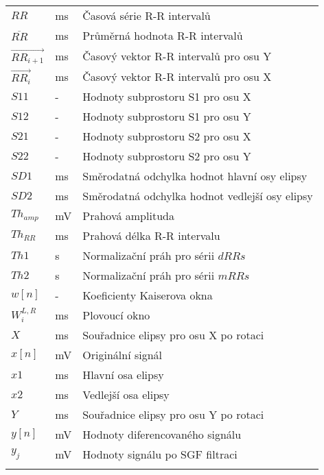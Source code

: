 \begin{table}[H]
\begin{center}
\begin{tabular}{p{2.5cm}p{2.5cm}p{8.25cm}}
			$RR$                        & ms       & Časová série R-R intervalů                     \\
			$\overline{RR}$             & ms       & Průměrná hodnota R-R intervalů                 \\
			$\overrightarrow{RR_{i+1}}$ & ms        & Časový vektor R-R intervalů pro osu Y          \\
			$\overrightarrow{RR_i}$     & ms        & Časový vektor R-R intervalů pro osu X          \\
			$S11$                       & -        & Hodnoty subprostoru S1 pro osu X               \\
			$S12$                       & -        & Hodnoty subprostoru S1 pro osu Y               \\
			$S21$                       & -        & Hodnoty subprostoru S2 pro osu X               \\
			$S22$                       & -        & Hodnoty subprostoru S2 pro osu Y               \\
			$SD1$                       & ms       & Směrodatná odchylka hodnot hlavní osy elipsy   \\
			$SD2$                       & ms       & Směrodatná odchylka hodnot vedlejší osy elipsy \\
			$Th_{amp}$                  & mV       & Prahová amplituda                              \\
			$Th_{RR}$                   & ms       & Prahová délka R-R intervalu                    \\
			$Th1$                       & s        & Normalizační práh pro sérii $dRRs$             \\
			$Th2$                       & s        & Normalizační práh pro sérii $mRRs$             \\
			$w[n]$                      & -        & Koeficienty Kaiserova okna                     \\
			$W_i^{L,R}$                 & ms       & Plovoucí okno                                  \\
			$X$                         & ms       & Souřadnice elipsy pro osu X po rotaci          \\
			$x[n]$                      & mV       & Originální signál                              \\
			$x1$                        & ms       & Hlavní osa elipsy                              \\
			$x2$                        & ms       & Vedlejší osa elipsy                            \\
			$Y$                         & ms       & Souřadnice elipsy pro osu Y po rotaci          \\
			$y[n]$                      & mV       & Hodnoty diferencovaného signálu                \\
			$y_j$                       & mV       & Hodnoty signálu po SGF filtraci                \\
			\noalign{\hrule height 2pt}
		\end{tabular}
	\end{center}
\end{table}

